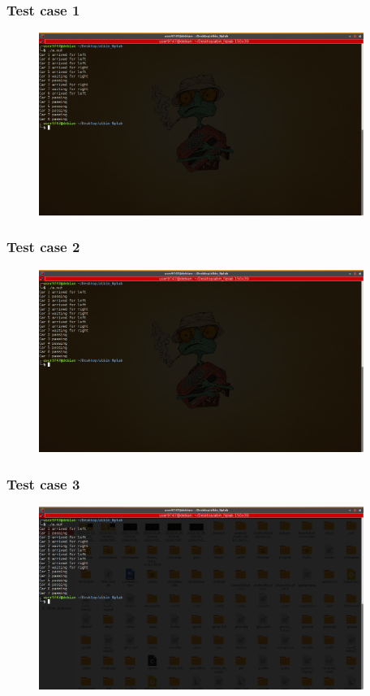 \documentclass{article}
\begin{document}
\subsubsection{Test case 1}
 \begin{figure}[H]
\centering
\includegraphics[width=400]{img/bd1.png}
\end{figure}

\subsubsection{Test case 2}
 \begin{figure}[H]
\centering
\includegraphics[width=400]{img/bd2.png}
\end{figure}

\subsubsection{Test case 3}
 \begin{figure}[H]
\centering
\includegraphics[width=400]{img/bd3.png}
\end{figure}
  
  
  
\end{document}
